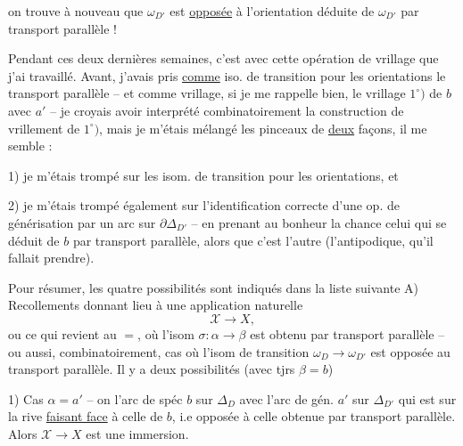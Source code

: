 on trouve à nouveau que $\omega_{D'}$ est \uline{opposée} à l'orientation  déduite de $\omega_{D'}$ par transport parallèle !

Pendant ces deux dernières semaines, c'est avec cette opération de vrillage que j'ai travaillé. Avant, j'avais pris  \uline{comme} iso. de transition pour les orientations le transport parallèle --  et comme  vrillage, si je me rappelle bien, le vrillage $1^\circ)$ de $b$ avec $a'$ -- je croyais avoir interprété combinatoirement la construction de vrillement de $1^\circ)$, mais je m'étais mélangé les pinceaux de \uline{deux} façons, il me semble :

1) je m'étais trompé sur les isom. de transition pour les orientations, et

2) je m'étais trompé également sur l'identification correcte d'une op. de générisation  par un arc sur $\partial\Delta_{D'}$ -- en prenant au bonheur la chance celui qui   se déduit de \uline{$b$} par transport parallèle, alors que c'est l'autre  (l'antipodique, qu'il fallait prendre).

Pour résumer, les quatre possibilités sont indiqués dans la liste suivante
A) Recollements donnant lieu à une application naturelle
\[
\mathscr X\longrightarrow X,
\]
ou ce qui revient au $=$, où l'isom $\sigma:\alpha\longrightarrow\beta$  est obtenu par transport parallèle -- ou aussi, combinatoirement, cas où l'isom de transition $\omega_D\longrightarrow\omega_{D'}$ est opposée au transport parallèle. Il y a deux possibilités (avec tjrs $\beta=b$)

1) Cas $\alpha=a'$ -- on    l'arc de spéc $b$ sur $\Delta_D$ avec l'arc  de gén. $a'$ sur $\Delta_{D'}$ qui est sur la rive \uline{faisant face} à celle de $b$, i.e opposée à celle obtenue par transport parallèle.  Alors $\mathscr X\to X$ est une immersion. 

